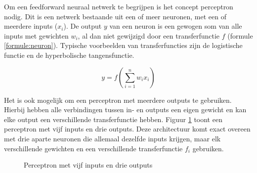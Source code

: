 Om een feedforward neuraal netwerk te begrijpen is het concept perceptron nodig. Dit is een netwerk bestaande uit een of meer neuronen, met een of meerdere inputs ($x_i$). De output $y$ van een neuron is een gewogen som van alle inputs met gewichten $w_i$, al dan niet gewijzigd door een transferfunctie $f$ (formule \ref{formule:neuron}). Typische voorbeelden van transferfuncties zijn de logistische functie en de hyperbolische tangensfunctie.

\begin{equation}
    y = f(\sum\limits_{i=1}^{n}w_i x_i)
    \label{formule:neuron}
\end{equation}

Het is ook mogelijk om een perceptron met meerdere outputs te gebruiken. Hierbij hebben alle verbindingen tussen in- en outputs een eigen gewicht en kan elke output een verschillende transferfunctie hebben. Figuur \ref{fig:perceptron} toont een perceptron met vijf inputs en drie outputs. Deze architectuur komt exact overeen met drie aparte neuronen die allemaal dezelfde inputs krijgen, maar elk verschillende gewichten en een verschillende transferfunctie $f_i$ gebruiken.

\begin{figure}[ht]
\def\layersep{2.5cm}
\centering
{}
\caption{Perceptron met vijf inputs en drie outputs}
\label{fig:perceptron}
\end{figure}



